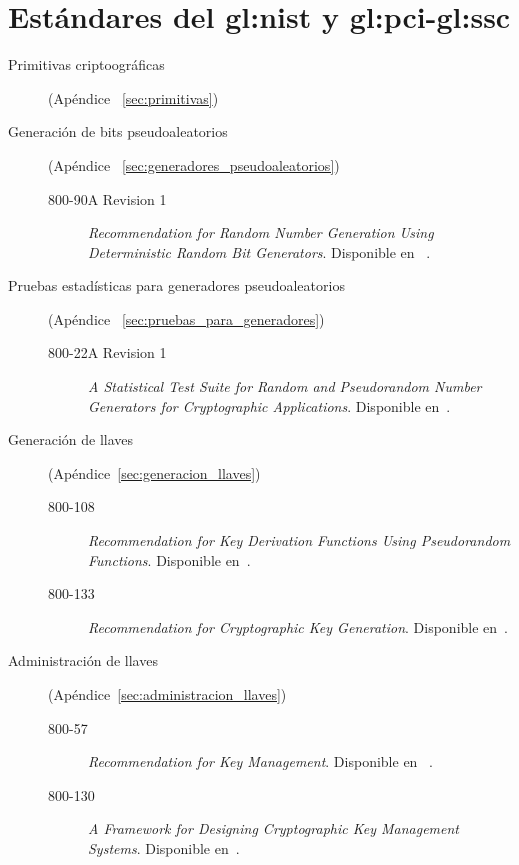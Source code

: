 %
%

\section{Estándares del \texorpdfstring{\acrshort{gl:nist}}{NIST} y %
\texorpdfstring{\acrshort{gl:pci}}{PCI}-\texorpdfstring{\acrshort{gl:ssc}}{SSC}}

\begin{description}

  \item[Primitivas criptoográficas] (Apéndice
   ~\ref{sec:primitivas})

  \item[Generación de bits pseudoaleatorios] (Apéndice
   ~\ref{sec:generadores_pseudoaleatorios})
    \begin{description}
      \item[800-90A Revision 1] \textit{Recommendation for Random Number
        Generation Using Deterministic Random Bit Generators}. Disponible en
       ~\cite{nist_aleatorios}.
    \end{description}

    \item[Pruebas estadísticas para generadores pseudoaleatorios] (Apéndice
    ~\ref{sec:pruebas_para_generadores})
    \begin{description}
      \item[800-22A Revision 1] \textit{A Statistical Test Suite for Random and
      Pseudorandom Number Generators for Cryptographic Applications}.
      Disponible en~\cite{nist_pruebas}.
    \end{description}

    \item[Generación de llaves] (Apéndice~\ref{sec:generacion_llaves})
    \begin{description}
      \item[800-108] \textit{Recommendation for Key Derivation Functions Using
      Pseudorandom Functions}. Disponible en~\cite{nist_derivacion_llaves}.
      \item[800-133] \textit{Recommendation for Cryptographic Key Generation}.
      Disponible en~\cite{nist_creacion_llaves}.
    \end{description}

  \item[Administración de llaves] (Apéndice~\ref{sec:administracion_llaves})
    \begin{description}
      \item[800-57] \textit{Recommendation for Key Management}. Disponible en
       ~\cite{nist_llaves}.
      \item[800-130] \textit{A Framework for Designing Cryptographic Key
        Management Systems}. Disponible en~\cite{nist_disenio_llaves}.
    \end{description}
\end{description}



